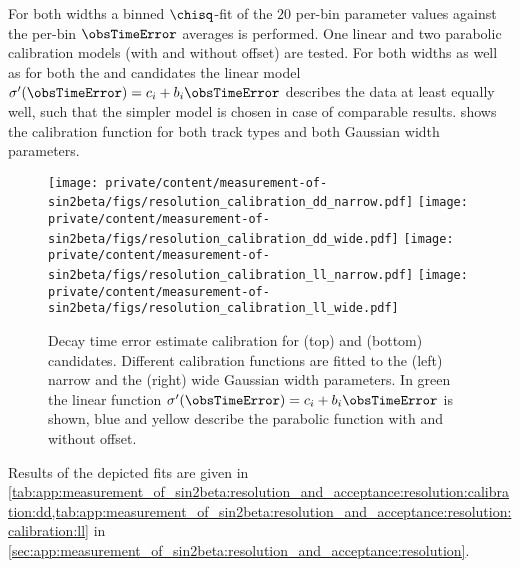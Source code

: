 For both widths a binned $\chisq$-fit of the $\num{20}$ per-bin parameter values
against the per-bin $\obsTimeError$ averages is performed. One linear and two
parabolic calibration models (with and without offset) are tested. For both
widths as well as for both the \catDD and \catLL candidates the linear model
$\sigma^\prime(\obsTimeError) = c_i + b_i \obsTimeError$ describes the data at
least equally well, such that the simpler model is chosen in case of comparable
results. 
shows the calibration function for both track types and both Gaussian width
parameters.
%
\begin{figure}[h]
\texttt{[image: private/content/measurement-of-sin2beta/figs/resolution\_calibration\_dd\_narrow.pdf]}
\texttt{[image: private/content/measurement-of-sin2beta/figs/resolution\_calibration\_dd\_wide.pdf]}
\texttt{[image: private/content/measurement-of-sin2beta/figs/resolution\_calibration\_ll\_narrow.pdf]}
\texttt{[image: private/content/measurement-of-sin2beta/figs/resolution\_calibration\_ll\_wide.pdf]}
\label{fig:measurement_of_sin2beta:resolution_and_acceptance:resolution:calibration}
\caption{Decay time error estimate calibration for (top) \catDD and (bottom)
\catLL candidates. Different calibration functions are fitted to the (left)
narrow and the (right) wide Gaussian width parameters. In green the linear
function $\sigma^\prime(\obsTimeError) = c_i + b_i \obsTimeError$ is shown, blue
and yellow describe the parabolic function with and without offset.}
\end{figure}
%
Results of the depicted fits are given in 
\cref{tab:app:measurement_of_sin2beta:resolution_and_acceptance:resolution:calibration:dd,tab:app:measurement_of_sin2beta:resolution_and_acceptance:resolution:calibration:ll}
in \cref{sec:app:measurement_of_sin2beta:resolution_and_acceptance:resolution}.

